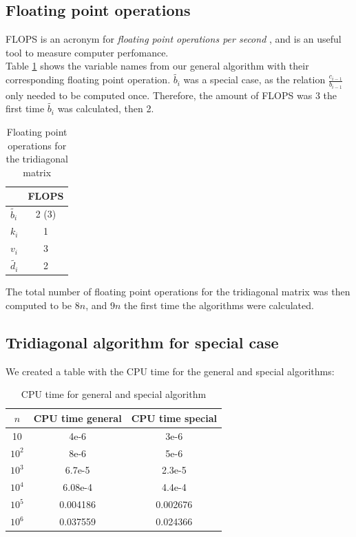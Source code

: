 \documentclass[12pt]{article}
\begin{document}

\subsection{Floating point operations}

\noindent FLOPS is an acronym for \textit{floating point operations per second} \citep{WikiF}, and is an useful tool to measure computer perfomance. \\

\noindent Table \ref{tab:fl1} shows the variable names from our general algorithm with their corresponding floating point operation. $\tilde{b_i}$ was a special case, as the relation $\frac{c_{i-1}}{b_{i-1}}$ only needed to be computed once. Therefore, the amount of FLOPS was 3 the first time $\tilde{b_i}$ was calculated, then 2. \\

\begin{table}[H]
    \centering
    \begin{tabular}{ l | c }
        &FLOPS \\ \hline
        $\tilde{b_i}$ & 2 (3) \\
        $k_i$& 1 \\
        $v_i$ & 3 \\
        $\tilde{d_i}$ & 2 \\
    \end{tabular}
    \caption{Floating point operations for the tridiagonal matrix}
    \label{tab:fl1}
\end{table}

\noindent The total number of floating point operations for the tridiagonal matrix was then computed to be $8n$, and $9n$ the first time the algorithms were calculated.



\subsection{Tridiagonal algorithm for special case}

\noindent We created a table with the CPU time for the general and special algorithms:

\begin{table}[H]
    \centering
    \begin{tabular}{ c | c | c }
    	$n$ & CPU time general & CPU time special \\
    	\hline
    	10     & 4e-6     & 3e-6 \\
    	$10^2$ & 8e-6     & 5e-6 \\
    	$10^3$ & 6.7e-5   & 2.3e-5 \\
    	$10^4$ & 6.08e-4  & 4.4e-4 \\
    	$10^5$ & 0.004186 & 0.002676 \\
    	$10^6$ & 0.037559 & 0.024366 \\
    \end{tabular}
    \caption{CPU time for general and special algorithm}
    \label{tab:cpu}
\end{table}
\medskip
\end{document}
